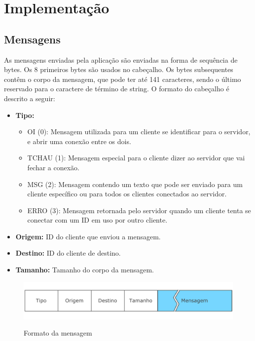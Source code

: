 \documentclass[a4paper,10pt]{article}
\begin{document}
\section{Implementação}
\subsection{Mensagens}
As mensagens enviadas pela aplicação são enviadas na forma de sequência de
bytes. Os 8 primeiros bytes são usados no cabeçalho. Os bytes subsequentes contêm o corpo da
mensagem, que pode ter até 141 caracteres, sendo o último reservado para o caractere de término de string. O formato do cabeçalho é descrito a
seguir:

\begin{itemize}
 \item \textbf{Tipo:}
  \begin{itemize}
    \item OI (0): Mensagem utilizada para um cliente se identificar para o
    servidor, e abrir uma conexão entre os dois.
    \item TCHAU (1): Mensagem especial para o cliente dizer ao servidor que
    vai fechar a conexão.
    \item MSG (2): Mensagem contendo um texto que pode ser enviado para um
    cliente específico ou para todos os clientes conectados ao servidor.
    \item ERRO (3): Mensagem retornada pelo servidor quando um cliente tenta se
    conectar com um ID em uso por outro cliente.
  \end{itemize}
 \item \textbf{Origem:} ID do cliente que enviou a mensagem.
 \item \textbf{Destino:} ID do cliente de destino.
 \item \textbf{Tamanho:} Tamanho do corpo da mensagem.
\end{itemize}

\begin{figure}[ht!]
\begin{center}
\includegraphics[scale=0.6]{imagens/mensagem.pdf}
\label{fig:mensagem}
\caption{Formato da mensagem}
\end{center}
\end{figure}
\end{document}
